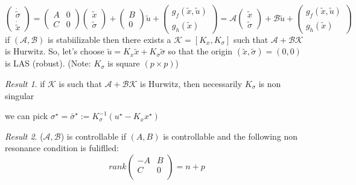 \documentclass{book}
\theoremstyle{definition}
\theoremstyle{remark}
\theoremstyle{remark}
\newtheorem*{result}{Result}
\begin{document}
\[
    \begin{pmatrix}
        \dot{\tilde{\sigma}} \\ \dot{\tilde{x}}
    \end{pmatrix} = \begin{pmatrix}
        A & 0 \\ C & 0
    \end{pmatrix}\begin{pmatrix}
        \tilde{x} \\ \tilde{\sigma}
    \end{pmatrix}+\begin{pmatrix}
        B \\ 0
    \end{pmatrix}\tilde{u} + \begin{pmatrix}
        g_f(\tilde{x},\tilde{u}) \\ g_h(\tilde{x})
    \end{pmatrix}=\mathcal{A}\begin{pmatrix}
        \tilde{x} \\ \tilde{\sigma}
    \end{pmatrix}+\mathcal{B}\tilde{u} + \begin{pmatrix}
        g_f(\tilde{x},\tilde{u}) \\ g_h(\tilde{x})
    \end{pmatrix}
\]
if $(\mathcal{A},\mathcal{B})$ is stabiilizable then there exists a $\mathcal{K}=[K_x,K_\sigma]$ such that $\mathcal{A}+\mathcal{B}\mathcal{K}$ is Hurwitz. So, let's choose $\tilde{u}=K_x\tilde{x}+K_\sigma \tilde{\sigma}$ so that the origin $(\tilde{x},\tilde{\sigma})=(0,0)$ is LAS (robust). (Note: $K_\sigma$ is square $(p \times p)$)
\begin{result}
    if $\mathcal{K}$ is such that $\mathcal{A}+\mathcal{B}\mathcal{K}$ is Hurwitz, then necessarily $K_\sigma$ is non singular
\end{result}

we can pick $\sigma^\star=\bar{\sigma}^\star := K_\sigma^{-1}(u^\star-K_xx^\star)$

\begin{result}
    ($\mathcal{A},\mathcal{B}$) is controllable if $(A,B)$ is controllable and the following non resonance condition is fuliflled:
    \[
        rank\begin{pmatrix}
            -A & B\\
            C &  0\\
        \end{pmatrix}=n+p
    \]
\end{result}
\end{document}
